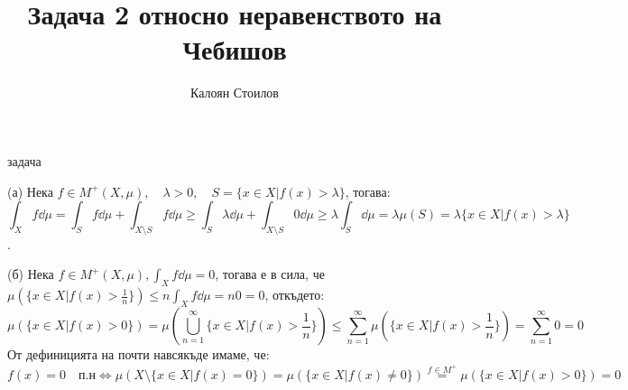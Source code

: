 \documentclass[bulgarian, 12pt]{article}
\title{\textbf{Задача 2} относно неравенството на Чебишов}
\author{Калоян Стоилов}
\begin{document}
\maketitle
\begin{labeling}{задача}
\item [(а)] Нека $f \in M^+(X,\mu), \quad \lambda > 0, \quad S = \{x \in X | f(x) > \lambda\}$, тогава:
  \[
    \int_{X} f \dd \mu = \int_{S} f \dd \mu + \int_{X \setminus S} f \dd \mu \geq \int_{S} \lambda \dd \mu + \int_{X \setminus S} 0 \dd \mu \geq \lambda \int_{S} \dd \mu = \lambda \mu(S) = \lambda \{x \in X | f(x) > \lambda\}
  \].

\item [(б)] Нека $f \in M^+(X,\mu), \int_{X} f \dd{\mu} = 0$, тогава е в сила, че $\mu(\{x \in X | f(x) > \frac{1}{n}\}) \leq n \int_{X} f \dd{\mu} = n 0 = 0$, откъдето:
  \[
    \mu(\{x \in X | f(x) > 0\}) = \mu(\bigcup_{n=1}^{\infty} \{x \in X | f(x) > \frac{1}{n}\}) \leq \sum_{n=1}^{\infty} \mu(\{x \in X | f(x) > \frac{1}{n}\}) = \sum_{n=1}^{\infty} 0 = 0
  \]
  От дефиницията на почти навсякъде имаме, че:
  \[
    f(x) = 0 \quad \text{п.н} \iff \mu(X \setminus \{x \in X | f(x) = 0\}) = \mu(\{x \in X | f(x) \neq 0\}) \overset{f \in M^+}{=} \mu(\{x \in X | f(x) > 0\}) = 0
  \]
\end{labeling}
\end{document}
